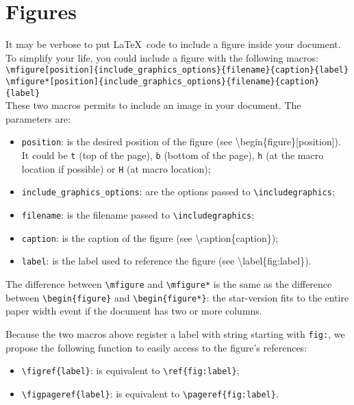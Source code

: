 \documentclass[book]{upmethodology-document}
\begin{document}
\section{Figures}

It may be verbose to put \LaTeX\ code to include a figure inside your document. To simplify your life, you could include a figure with the following macros: \\
\texttt{{\textbackslash}mfigure[position]\{include\_graphics\_options\}\{filename\}\{caption\}\{label\}} \\
\texttt{{\textbackslash}mfigure*[position]\{include\_graphics\_options\}\{filename\}\{caption\}\{label\}} \\

These two macros permits to include an image in your document. The parameters are:
\begin{itemize}
\item \texttt{position}: is the desired position of the figure (see {\textbackslash}begin\{figure\}[position]). It could be \texttt{t} (top of the page), \texttt{b} (bottom of the page), \texttt{h} (at the macro location if possible) or \texttt{H} (at macro location);

\item \texttt{include\_graphics\_options}: are the options passed to \texttt{{\textbackslash}includegraphics};

\item \texttt{filename}: is the filename passed to \texttt{{\textbackslash}includegraphics};

\item \texttt{caption}: is the caption of the figure (see {\textbackslash}caption\{caption\});

\item \texttt{label}: is the label used to reference the figure (see {\textbackslash}label\{fig:label\}).
\end{itemize}

The difference between \texttt{{\textbackslash}mfigure} and \texttt{{\textbackslash}mfigure*} is the same as the difference between \texttt{{\textbackslash}begin\{figure\}} and \texttt{{\textbackslash}begin\{figure*\}}: the star-version fits to the entire paper width event if the document has two or more columns.

Because the two macros above register a label with string starting with \texttt{fig:}, we propose the following function to easily access to the figure's references:
\begin{itemize}
\item \texttt{{\textbackslash}figref\{label\}}: is equivalent to \texttt{{\textbackslash}ref\{fig:label\}};
\item \texttt{{\textbackslash}figpageref\{label\}}: is equivalent to \texttt{{\textbackslash}pageref\{fig:label\}}.
\end{itemize}
\end{document}
